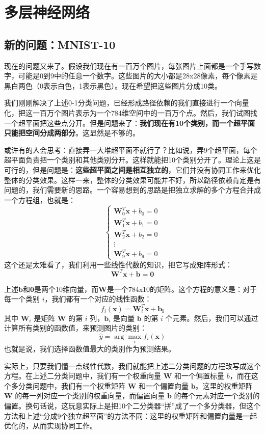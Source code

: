 \section{多层神经网络}

\subsection{新的问题：MNIST-10}

现在的问题又来了。假设我们现在有一百万个图片，每张图片上面都是一个手写数字，可能是0到9中的任意一个数字。这些图片的大小都是28x28像素，每个像素是黑白两色（0表示白色，1表示黑色）。现在希望把这些图片分成10类。

我们刚刚解决了上述0-1分类问题，已经形成路径依赖的我们直接进行一个向量化，把这一百万个图片表示为一个784维空间中的一百万个点。然后，我们试图找一个超平面把这些点分开。但是问题来了：\textbf{我们现在有10个类别，而一个超平面只能把空间分成两部分}。这显然是不够的。

或许有的人会思考：直接弄一大堆超平面不就行了？比如说，弄9个超平面，每个超平面负责把一个类别和其他类别分开。这样就能把10个类别分开了。理论上这是可行的，但是问题是：\textbf{这些超平面之间是相互独立的}，它们并没有协同工作来优化整体的分类效果。这样一来，整体的分类效果可能并不好，所以路径依赖肯定是有问题的，我们需要新的思路。一个容易想到的思路是把独立求解的多个方程合并成一个方程组，也就是：
\[\begin{cases}
\mathbf{W}_0^T \mathbf{x} + b_0 = 0 \\
\mathbf{W}_1^T \mathbf{x} + b_1 = 0 \\
\mathbf{W}_2^T \mathbf{x} + b_2 = 0 \\
\vdots \\
\mathbf{W}_9^T \mathbf{x} + b_9 = 0
\end{cases}\]
这个还是太难看了，我们利用一些线性代数的知识，把它写成矩阵形式：
\[ \mathbf{W}^T \mathbf{x} + \mathbf{b} = \mathbf{0} \]

上述$\mathbf{b}$和$\mathbf{0}$是两个10维向量，而$\mathbf{W}$是一个784x10的矩阵。这个方程的意义是：对于每一个类别 $i$，我们都有一个对应的线性函数：
\[ f_i(\mathbf{x}) = \mathbf{W}_i^T \mathbf{x + b_i} \]
其中 $\mathbf{W}_i$ 是矩阵 $\mathbf{W}$ 的第 $i$ 列，$\mathbf{b}_i$ 是向量 $\mathbf{b}$ 的第 $i$ 个元素。然后，我们可以通过计算所有类别的函数值，来预测图片的类别：
\[ \hat{y} = \arg\max_{i} f_i(\mathbf{x}) \]
也就是说，我们选择函数值最大的类别作为预测结果。

实际上，只要我们懂一点线性代数，我们就能把上述二分类问题的方程改写成这个方程。在上述二分类问题中，我们有一个权重向量 $\mathbf{W}$ 和一个偏置标量 $b$，而在这个多分类问题中，我们有一个权重矩阵 $\mathbf{W}$ 和一个偏置向量 $\mathbf{b}$。这里的权重矩阵 $\mathbf{W}$ 的每一列对应一个类别的权重向量，而偏置向量 $\mathbf{b}$ 的每个元素对应一个类别的偏置。换句话说，这玩意实际上是把10个二分类器“拼”成了一个多分类器，但这个方法和上述“分成9个独立超平面”的方法不同：这里的权重矩阵和偏置向量是一起优化的，从而实现协同工作。

